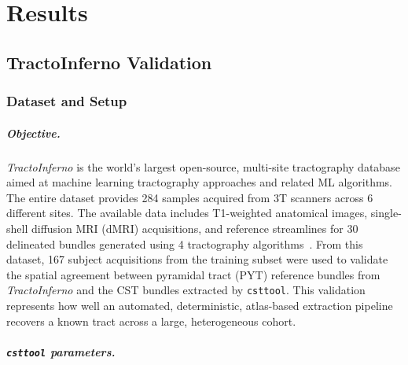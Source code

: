 
\chapter{Results}
\label{ch:results}

\section{TractoInferno Validation}
\label{sec:results-tractoinferno}

\subsection{Dataset and Setup}
\label{subsec:tractoinferno-setup}

\paragraph{Objective.} 

\textit{TractoInferno} is the world's largest open-source, multi-site tractography database aimed at machine learning tractography approaches and related ML algorithms. The entire dataset provides 284  samples acquired from 3T scanners across 6 different sites. The available data includes T1-weighted anatomical images, single-shell diffusion MRI (dMRI) acquisitions, and reference streamlines for 30 delineated bundles generated using 4 tractography algorithms~\cite{poulin2022tractoinferno}. From this dataset, 167 subject acquisitions from the training subset were used to validate the spatial agreement between pyramidal tract (PYT) reference bundles from \textit{TractoInferno} and the CST bundles extracted by \texttt{csttool}. This validation represents how well an automated, deterministic, atlas-based extraction pipeline recovers a known tract across a large, heterogeneous cohort.

\paragraph{\texttt{csttool} parameters.}

